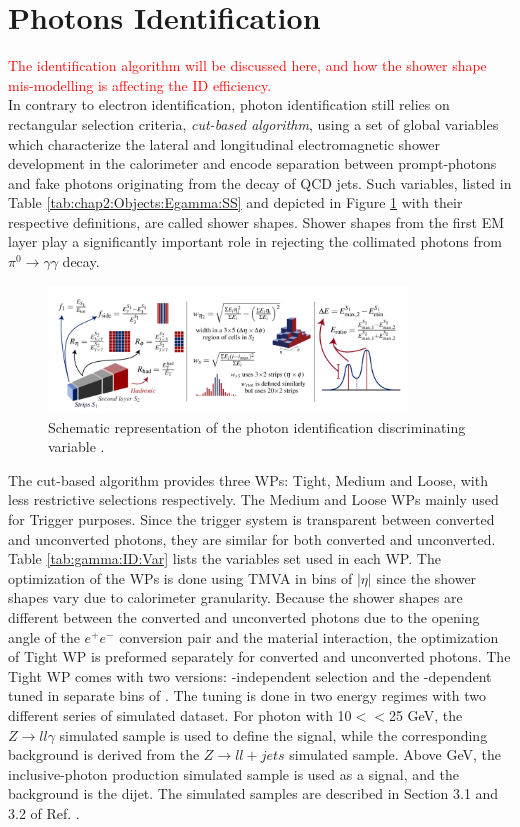 \section{Photons Identification}
\label{gamma:ID}
\textcolor{red}{
The identification algorithm will be discussed here, and how the shower shape mis-modelling is affecting the ID efficiency. \\
}
In contrary to electron identification, photon identification still relies on rectangular selection criteria, \emph{cut-based algorithm}, using a set of global variables which characterize the lateral and longitudinal electromagnetic shower development in the calorimeter and encode separation between prompt-photons and fake photons originating from the decay of QCD jets. Such variables, listed in Table \ref{tab:chap2:Objects:Egamma:SS} and depicted in Figure \ref{fig:gamma:ID:SS} with their respective definitions, are called shower shapes. Shower shapes from the first EM layer play a significantly important role in rejecting the collimated photons from $\pi^0\rightarrow\gamma\gamma$ decay. \\ 
\begin{figure}[ht]
    \centering
    \includegraphics[width=0.85\textwidth]{Ch3/Img/ShowerShapes.png}
    \caption{Schematic representation of the photon identification discriminating variable \cite{ShowerShapes_fig}. \\}
    \label{fig:gamma:ID:SS}
\end{figure}
The cut-based algorithm provides three WPs: Tight, Medium and Loose, with less restrictive selections respectively. The Medium and Loose WPs mainly used for Trigger purposes. Since the trigger system is transparent between converted and unconverted photons, they are similar for both converted and unconverted. Table \ref{tab:gamma:ID:Var} lists the variables set used in each WP. The optimization of the WPs is done using TMVA \cite{TMVA} in bins of $|\eta|$ since the shower shapes vary due to calorimeter granularity. Because the shower shapes are different between the converted and unconverted photons due to the opening angle of the $e^+e^-$ conversion pair and the material interaction, the optimization of Tight WP is preformed separately for converted and unconverted photons. The Tight WP comes with two versions: \eT-independent selection and the \eT-dependent tuned in separate bins of \eT. The tuning is done in two energy regimes with two different series of simulated dataset. For photon with 10$<$\eT$<$25 GeV, the $Z\rightarrow ll\gamma$ simulated sample is used to define the signal, while the corresponding background is derived from the $Z\rightarrow ll+jets$ simulated sample. Above  GeV, the inclusive-photon production simulated sample is used as a signal, and the background is the dijet. The simulated samples are described in Section 3.1 and 3.2 of Ref. \cite{Egamma_Perf_2017}.    
